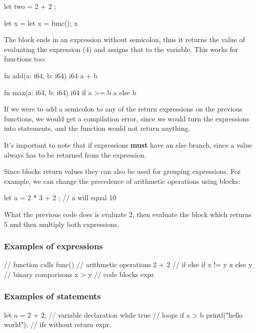 ﻿\documentclass[10pt,a4paper,twocolumn,twoside]{article}
\begin{document}
\begin{code}
    let two = {
        2 + 2
    };

    let x = {
        let x = func();
        x
    }
\end{code}

The block ends in an expression without semicolon, thus it returns the value of
evaluating the expression (4) and assigns that to the variable. This works for 
functions too:

\begin{code}
    fn add(a: i64, b: i64) i64 {
        a + b
    }

    fn max(a: i64, b: i64) i64 {
        if a >= b { a } else { b }
    }
\end{code}

If we were to add a semicolon to any of the return expressions on the previous
functions, we would get a compilation error, since we would turn the expressions
into statements, and the function would not return anything.

It's important to note that if expressions \textbf{must} have an else branch,
since a value always has to be returned from the expression.

Since blocks return values they can also be used for grouping expressions. For
example, we can change the precedence of arithmetic operations using blocks:

\begin{code}
    let a =  2 * { 3 + 2 }; // a will equal 10
\end{code}

What the previous code does is evaluate 2, then evaluate the block which returns
5 and then multiply both expressions.

\subsubsection{Examples of expressions}
\begin{code}
// function calls
func()
// arithmetic operations
2 + 2 
// if else
if x != y { x } else { y }
// binary comparisons
x > y 
// code blocks
{ expr }
\end{code}

\subsubsection{Examples of statements}
\begin{code}
let a = 2 + 2;  // variable declaration
while true {  } // loops
if a > b { printf("hello world"); } // ifs without return expr.
\end{code}
\end{document}
